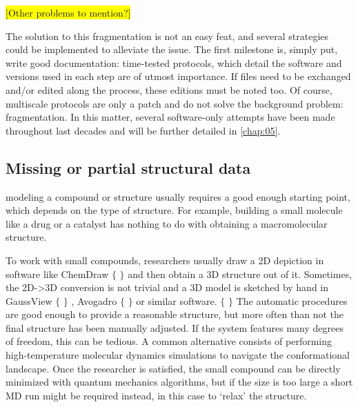 \colorbox{yellow}{ [Other problems to mention?]}

The solution to this fragmentation is not an easy feat, and several strategies could be implemented to alleviate the issue. The first milestone is, simply put, write good documentation: time-tested protocols, which detail the software and versions used in each step are of utmost importance. If files need to be exchanged and/or edited along the process, these editions must be noted too. Of course, multiscale protocols are only a patch and do not solve the background problem: fragmentation. In this matter, several software-only attempts have been made throughout last decades and will be further detailed in \autoref{chap:05}.

\subsection{Missing or partial structural data}
modeling a compound or structure usually requires a good enough starting point, which depends on the type of structure. For example, building a small molecule like a drug or a catalyst has nothing to do with obtaining a macromolecular structure.

To work with small compounds, researchers usually draw a 2D depiction in software like ChemDraw $ \{ $ $ \} $  and then obtain a 3D structure out of it. Sometimes, the 2D->3D conversion is not trivial and a 3D model is sketched by hand in GaussView $ \{ $ $ \} $ , Avogadro $ \{ $ $ \} $  or similar software. $ \{ $ $ \} $  The automatic procedures are good enough to provide a reasonable structure, but more often than not the final structure has been manually adjusted. If the system features many degrees of freedom, this can be tedious. A common alternative consists of performing high-temperature molecular dynamics simulations to navigate the conformational landscape. Once the researcher is satisfied, the small compound can be directly minimized with quantum mechanics algorithms, but if the size is too large a short MD run might be required instead, in this case to ‘relax’ the structure.

